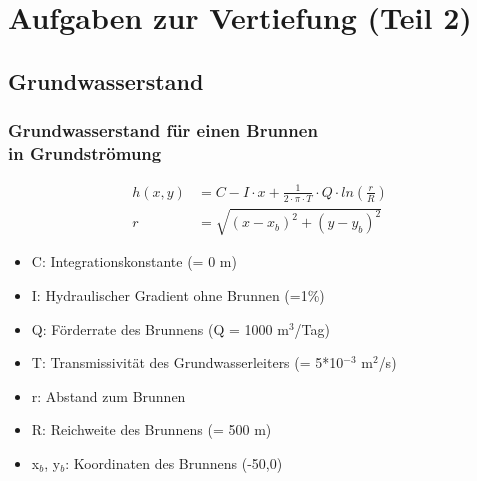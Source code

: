 


\usepackage{amsmath}
\usepackage{mathtools}
\setcounter{mchapter}{6}
\setcounter{mexercise}{0}


  

  \section{Aufgaben zur Vertiefung (Teil 2)}

  \subsection{Grundwasserstand}
  	\begin{frame}
		\frametitle{Grundwasserstand für einen Brunnen\\ in Grundströmung}
		\begin{align*}
			h \left(x,y \right) &= C-I \cdot x + \frac{1}{2 \cdot \pi \cdot T} \cdot Q \cdot ln \left( \frac{r}{R} \right) \\
			r &= \sqrt{\left( x-x_{b} \right)^{2}+\left( y-y_{b} \right)^{2}}                
        \end{align*}  
		\begin{small}        
        \begin{itemize}
        	\item C: Integrationskonstante (= 0 m)
        	\item I: Hydraulischer Gradient ohne Brunnen (=1\%)
			\item Q: Förderrate des Brunnens (Q = 1000 m$^3$/Tag)
			\item T: Transmissivität des Grundwasserleiters (= 5*10$^{-3}$ m$^2$/s)
			\item r: Abstand zum Brunnen
			\item R: Reichweite des Brunnens (= 500 m)
			\item x$_b$, y$_b$:	Koordinaten des Brunnens (-50,0)
        \end{itemize}
        \end{small}
   	\end{frame}

